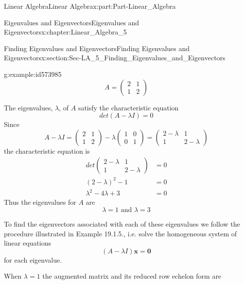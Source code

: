 \documentclass[oneside,10pt,]{book}
\numberwithin{equation}{section}
\newcommand{\amp}{&}
\begin{document}
\begin{partptx}{Linear Algebra}{}{Linear Algebra}{}{}{x:part:Part-Linear_Algebra}
\begin{chapterptx}{Eigenvalues and Eigenvectors}{}{Eigenvalues and Eigenvectors}{}{}{x:chapter:Linear_Algebra_5}
\begin{sectionptx}{Finding Eigenvalues and Eigenvectors}{}{Finding Eigenvalues and Eigenvectors}{}{}{x:section:Sec-LA_5_Finding_Eigenvalues_and_Eigenvectors}
\begin{example}{}{g:example:id573985}
\begin{equation*}
A=\begin{pmatrix} 2 \amp 1 \\ 1 \amp 2 \end{pmatrix} 
\end{equation*}
%
\par\smallskip%
\noindent\hypertarget{g:solution:id573982}{}The eigenvalues, \(\lambda\), of \(A\) satisfy the characteristic equation%
\begin{equation*}
det(A-\lambda I)=0
\end{equation*}
Since%
\begin{equation*}
A-\lambda I=\begin{pmatrix} 2\amp 1 \\ 1\amp 2 \end{pmatrix}-\lambda \begin{pmatrix} 1\amp 0 \\ 0\amp 1 \end{pmatrix}=\begin{pmatrix} 2-\lambda \amp 1 \\ 1\amp 2-\lambda \end{pmatrix}
\end{equation*}
the characteristic equation is%
\begin{align*}
det\begin{pmatrix} 2-\lambda \amp 1 \\ 1\amp 2-\lambda \end{pmatrix} \amp =0\\
(2-\lambda)^2-1 \amp =0\\
\lambda^2-4\lambda+3 \amp =0
\end{align*}
Thus the eigenvalues for \(A\) are%
\begin{equation*}
\lambda=1 \textrm{ and } \lambda=3
\end{equation*}
%
\par
To find the eigenvectors associated with each of these eigenvalues we follow the procedure illustrated in Example 19.1.5., i.e. solve the homogeneous system of linear equations%
\begin{equation*}
(A-\lambda I)\mathbf{x}=\mathbf{0}
\end{equation*}
for each eigenvalue.%
\par
When \(\lambda=1\) the augmented matrix and its reduced row echelon form are%
\begin{equation*}

\end{equation*}
\end{example}
\end{sectionptx}
\end{chapterptx}
\end{partptx}
\end{document}
